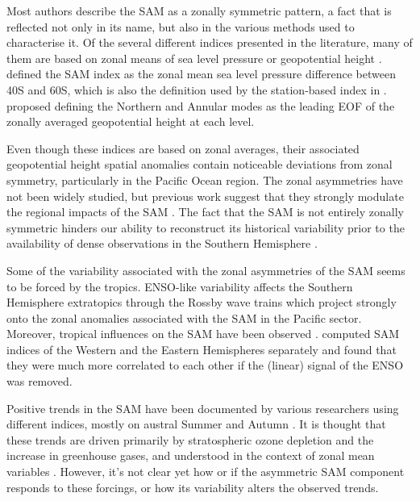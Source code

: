\documentclass[smallextended]{svjour3}       %
\begin{document}
Most authors describe the SAM as a zonally symmetric pattern, a fact that is reflected not only in its name, but also in the various methods used to characterise it. Of the several different indices presented in the literature, many of them are based on zonal means of sea level pressure or geopotential height \citep{ho2012}. \citet{gong1999} defined the SAM index as the zonal mean sea level pressure difference between 40\degree S and 60\degree S, which is also the definition used by the station-based index in \citet{marshall2003}. \citet{baldwin2009} proposed defining the Northern and Annular modes as the leading EOF of the zonally averaged geopotential height at each level.

Even though these indices are based on zonal averages, their associated geopotential height spatial anomalies contain noticeable deviations from zonal symmetry, particularly in the Pacific Ocean region. The zonal asymmetries have not been widely studied, but previous work suggest that they strongly modulate the regional impacts of the SAM \citep{fan2007, silvestri2009, fogt2012, rosso2018}. The fact that the SAM is not entirely zonally symmetric hinders our ability to reconstruct its historical variability prior to the availability of dense observations in the Southern Hemisphere \citep{jones2009}.

Some of the variability associated with the zonal asymmetries of the SAM seems to be forced by the tropics. ENSO-like variability affects the Southern Hemisphere extratopics through the Rossby wave trains \citep{mo1987, kidson1988, karoly1989} which project strongly onto the zonal anomalies associated with the SAM in the Pacific sector. Moreover, tropical influences on the SAM have been observed \citep{fan2007, fogt2011, clem2013}. \citet{fan2007} computed SAM indices of the Western and the Eastern Hemispheres separately and found that they were much more correlated to each other if the (linear) signal of the ENSO was removed.

Positive trends in the SAM have been documented by various researchers using different indices, mostly on austral Summer and Autumn \citep[e.g.][ and references therein]{fogt2020}. It is thought that these trends are driven primarily by stratospheric ozone depletion and the increase in greenhouse gases, and understood in the context of zonal mean variables \citep{marshall2004, gillett2005, arblaster2006, gillett2013}. However, it's not clear yet how or if the asymmetric SAM component responds to these forcings, or how its variability alters the observed trends.
\end{document}
